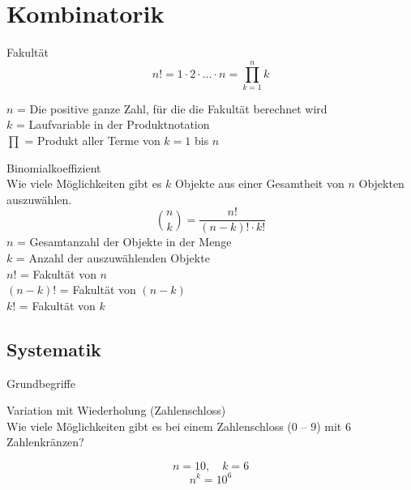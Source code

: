 \section{Kombinatorik}
\begin{definition}{Fakultät}\\
$$
n!=1 \cdot 2 \cdot \ldots \cdot n=\prod_{k=1}^{n} k
$$

   $n$ = Die positive ganze Zahl, für die die Fakultät berechnet wird\\
   $k$ = Laufvariable in der Produktnotation\\
   $\prod$ = Produkt aller Terme von $k=1$ bis $n$\\
\end{definition}

\begin{definition}{Binomialkoeffizient}\\
Wie viele Möglichkeiten gibt es $k$ Objekte aus einer Gesamtheit von $n$ Objekten auszuwählen.
$$
\binom{n}{k}=\frac{n!}{(n-k)!\cdot k!}
$$
   $n$ = Gesamtanzahl der Objekte in der Menge\\
   $k$ = Anzahl der auszuwählenden Objekte\\
   $n!$ = Fakultät von $n$\\
   $(n-k)!$ = Fakultät von $(n-k)$\\
   $k!$ = Fakultät von $k$\\
\end{definition}

\subsection{Systematik}
\begin{concept}{Grundbegriffe}\\
\begin{center}
\end{center}
\end{concept}
\begin{example}{Variation mit Wiederholung (Zahlenschloss)}\\
Wie viele Möglichkeiten gibt es bei einem Zahlenschloss (0 -- 9) mit 6 Zahlenkränzen?

$$n = 10, \quad k = 6$$
$$n^k = 10^6$$
\end{example}

